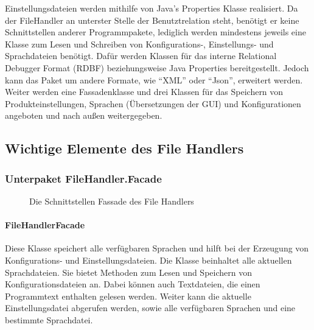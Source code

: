 \documentclass[parskip=full]{scrartcl}
\begin{document}
Einstellungsdateien werden mithilfe von Java's Properties Klasse realisiert.
Da der FileHandler an unterster Stelle der Benutztrelation steht, benötigt er keine Schnittstellen anderer Programmpakete, lediglich werden mindestens jeweils eine Klasse zum Lesen und Schreiben von Konfigurations-, Einstellungs- und Sprachdateien benötigt.
Dafür werden Klassen für das interne Relational Debugger Format (RDBF)  beziehungsweise Java Properties bereitgestellt. Jedoch kann das Paket um andere Formate, wie \enquote{XML} oder \enquote{Json}, erweitert werden.
Weiter werden eine Fassadenklasse und drei Klassen für das Speichern von Produkteinstellungen, Sprachen (Übersetzungen der GUI) und Konfigurationen angeboten und nach außen weitergegeben.
\subsection{Wichtige Elemente des File Handlers}
\subsubsection{Unterpaket FileHandler.Facade}
\begin{figure}[!h]
\caption{Die Schnittstellen Fassade des File Handlers}
\label{fig:facade_fileHandler}
\end{figure}
\paragraph{FileHandlerFacade}
Diese Klasse speichert alle verfügbaren Sprachen und hilft bei der Erzeugung von Konfigurations- und Einstellungsdateien.
Die Klasse beinhaltet alle aktuellen Sprachdateien.
Sie bietet Methoden zum Lesen und Speichern von Konfigurationsdateien an. Dabei können auch Textdateien, die einen Programmtext enthalten gelesen werden.
Weiter kann die aktuelle Einstellungsdatei abgerufen werden, sowie alle verfügbaren Sprachen und eine bestimmte Sprachdatei.
\end{document}
